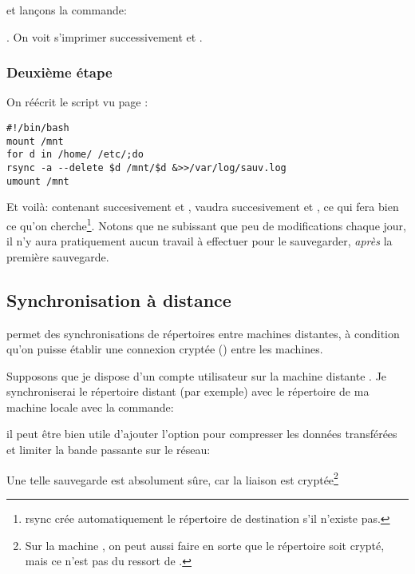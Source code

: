 
et lançons la commande:

.
On voit s'imprimer successivement   et .
\subsubsection{Deuxième étape} On réécrit le script vu page
\pageref{save1}:

\begin{center}
  \begin{boxedminipage}{0.85\textwidth}
\begin{verbatim}
#!/bin/bash
mount /mnt
for d in /home/ /etc/;do
rsync -a --delete $d /mnt/$d &>>/var/log/sauv.log
umount /mnt
\end{verbatim}
  \end{boxedminipage}
  \end{center}
Et voilà:  contenant succesivement  et ,
 vaudra succesivement  et
, ce qui fera bien ce qu'on cherche\footnote{
  rsync crée automatiquement le répertoire de destination s'il
  n'existe pas.}. Notons que
 ne subissant que peu de modifications chaque jour, il n'y
aura pratiquement aucun travail à effectuer pour le sauvegarder, \emph{après}
la première sauvegarde.

\subsection{Synchronisation à distance}
 permet des synchronisations de répertoires entre machines
distantes, à condition qu'on puisse établir une connexion cryptée
() entre les machines.

Supposons que je dispose d'un compte utilisateur   sur la
machine  distante . Je synchroniserai
le répertoire distant  (par exemple) avec le
répertoire  de ma machine locale avec la commande:


il peut être bien utile d'ajouter l'option  pour compresser
les données transférées et limiter la bande passante sur le réseau:


Une telle sauvegarde est absolument sûre, car la liaison est
cryptée\footnote{Sur la machine , on peut aussi faire
  en sorte que le répertoire  soit crypté, mais ce n'est
  pas du ressort de .}

